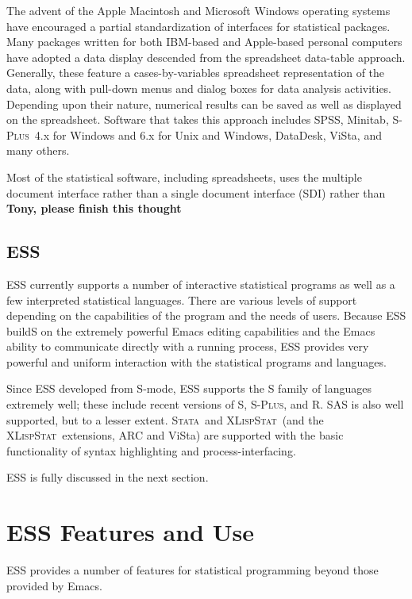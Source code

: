 \documentclass{article}
\newcommand*{\Splus}{\textsc{S-Plus}}
\newcommand*{\XLispStat}{\textsc{XLispStat}}
\newcommand*{\Stata}{\textsc{Stata}}
\newcommand{\marpar}[1]{\marginpar{\raggedright#1}}
\begin{document}
The advent of the Apple Macintosh and Microsoft Windows operating
systems have encouraged a partial standardization of interfaces for
statistical packages.  Many packages written for both IBM-based and
Apple-based personal computers have adopted a data display descended
from the spreadsheet data-table approach.  Generally, these feature a
cases-by-variables spreadsheet representation of the data, along with
pull-down menus and dialog boxes for data analysis activities.
Depending upon their nature, numerical results can be saved as well as
displayed on the spreadsheet.  Software that takes this approach
includes SPSS, Minitab, \Splus\ 4.x for Windows and 6.x for Unix and
Windows, DataDesk, ViSta, and many others.

Most of the statistical software, including spreadsheets, uses the
multiple document interface rather than a single document interface (SDI)
rather than {\bf Tony, please finish this thought}
\marpar{Tony}

\subsection{ESS}
\label{sec:UI:ESS}

ESS currently supports a number of interactive statistical programs as
well as a few interpreted statistical languages.  There are various
levels of support depending on the capabilities of the program and the
needs of users.  Because ESS buildS on the extremely powerful Emacs
editing capabilities and the Emacs ability to communicate directly
with a running process, ESS provides very powerful and uniform
interaction with the statistical programs and languages.

Since ESS developed from S-mode, ESS supports the S family of languages
extremely well; these include recent versions of S, \Splus, and R.
SAS is also well supported, but to a lesser extent.  \Stata\ and
\XLispStat\ (and the \XLispStat\ extensions, ARC and ViSta) are
supported with the basic functionality of syntax highlighting and
process-interfacing.

ESS is fully discussed in the next section.

\section{ESS Features and Use}
\label{sec:basic}

ESS provides a number of features for statistical programming beyond
those provided by Emacs.
\end{document}
